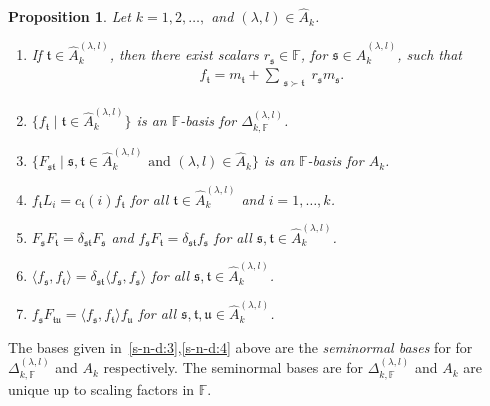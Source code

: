 \documentclass[11pt,a4paper,reqno,svgnames]{amsart}
\theoremstyle{plain}
\newtheorem{proposition}[theorem]{Proposition}
\theoremstyle{definition}
\numberwithin{equation}{section}
\begin{document}
\begin{proposition}\label{s-n-d}
Let $k=1,2,\ldots,$ and $(\lambda,l)\in\hat{A}_{k}$. 
\begin{enumerate}[label=(\arabic{*}), ref=\arabic{*},leftmargin=0pt,itemindent=1.5em]
\item\label{s-n-d:1} If $\mathfrak{t}\in\hat{A}_{k}^{(\lambda,l)}$, then there exist scalars $r_\mathfrak{s}\in \mathbb{F}$, for $\mathfrak{s}\in\hat{A}_{k}^{(\lambda,l)}$, such that 
\begin{align*}
f_\mathfrak{t}=m_\mathfrak{t}
+\sum_{\substack{\mathfrak{s}\succ\mathfrak{t}}} r_\mathfrak{s}m_\mathfrak{s}.
\end{align*}
\item\label{s-n-d:2} ${\lbrace}f_\mathfrak{t}\mid \mathfrak{t}\in\hat{A}_{k}^{(\lambda,l)}{\rbrace}$ is an $\mathbb{F}$-basis for $\Delta^{(\lambda,l)}_{k,\mathbb{F}}$. 
\item\label{s-n-d:3}${\lbrace}F_\mathfrak{st}\mid \text{$\mathfrak{s},\mathfrak{t}\in\hat{A}_{k}^{(\lambda,l)}$ and $(\lambda,l)\in\hat{A}_{k}$}{\rbrace}$ is an $\mathbb{F}$-basis for $A_{k}$. 
\item\label{s-n-d:4} $f_\mathfrak{t}L_i=c_\mathfrak{t}(i)f_\mathfrak{t}$ for all $\mathfrak{t}\in\hat{A}_k^{(\lambda,l)}$ and $i=1,\ldots,k$. 
\item\label{s-n-d:5}  $F_\mathfrak{s}F_\mathfrak{t} =\delta_\mathfrak{st}F_\mathfrak{s}$ and $f_\mathfrak{s}F_{\mathfrak{t}}= \delta_{\mathfrak{st}}f_\mathfrak{s}$ for all $\mathfrak{s},\mathfrak{t}\in\hat{A}_{k}^{(\lambda,l)}$.
\item\label{s-n-d:6}  $\langle f_\mathfrak{s},f_\mathfrak{t}\rangle=\delta_\mathfrak{st} \langle f_\mathfrak{s},f_\mathfrak{s}\rangle$ for all $\mathfrak{s},\mathfrak{t}\in\hat{A}_k^{(\lambda,l)}$.
\item\label{s-n-d:7} $f_\mathfrak{s}F_\mathfrak{tu}=\langle f_\mathfrak{s},f_\mathfrak{t}\rangle f_\mathfrak{u}$ for all $\mathfrak{s,t,u}\in\hat{A}_k^{(\lambda,l)}$.
\end{enumerate}
\end{proposition}
The bases given in~\eqref{s-n-d:3},\eqref{s-n-d:4} above are the \emph{seminormal bases} for for $\Delta^{(\lambda,l)}_{k,\mathbb{F}}$ and $A_k$ respectively. The seminormal bases are for $\Delta^{(\lambda,l)}_{k,\mathbb{F}}$ and $A_k$ are unique up to scaling factors in $\mathbb{F}$.  
\end{document}
